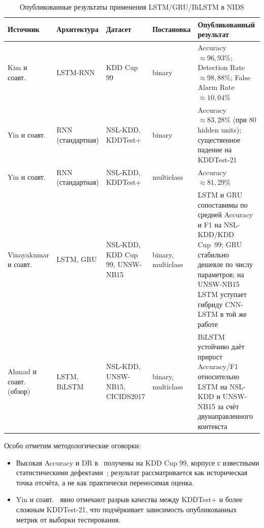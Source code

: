 \begin{table}[H]
\centering
\caption{Опубликованные результаты применения LSTM/GRU/BiLSTM в NIDS}
\label{tab:rnn-results}
\renewcommand{\arraystretch}{1.25}
\setlength{\tabcolsep}{4pt}
\small
\begin{tabularx}{\linewidth}{@{}lXlXX@{}}
\toprule
\textbf{Источник} & \textbf{Архитектура} & \textbf{Датасет} &
\textbf{Постановка} & \textbf{Опубликованный результат} \\
\midrule
Kim и соавт.~\cite{kim2016lstm} &
LSTM-RNN &
KDD Cup 99 &
binary &
Accuracy $\approx 96{,}93\%$; Detection Rate $\approx 98{,}88\%$;
False Alarm Rate $\approx 10{,}04\%$ \\
\addlinespace
Yin и соавт.~\cite{yin2017dlrnn} &
RNN (стандартная) &
NSL-KDD, KDDTest+ &
binary &
Accuracy $\approx 83{,}28\%$ (при 80 hidden units); существенное падение
на KDDTest-21 \\
\addlinespace
Yin и соавт.~\cite{yin2017dlrnn} &
RNN (стандартная) &
NSL-KDD, KDDTest+ &
multiclass &
Accuracy $\approx 81{,}29\%$ \\
\addlinespace
Vinayakumar и соавт.~\cite{vinayakumar2019dl} &
LSTM, GRU &
NSL-KDD, KDD Cup 99, UNSW-NB15 &
binary, multiclass &
LSTM и GRU сопоставимы по средней Accuracy и F1 на NSL-KDD/KDD Cup~99;
GRU стабильно дешевле по числу параметров; на UNSW-NB15 LSTM уступает
гибриду CNN-LSTM в той же работе \\
\addlinespace
Ahmad и соавт.~\cite{ahmad2021nids} (обзор) &
LSTM, BiLSTM &
NSL-KDD, UNSW-NB15, CICIDS2017 &
binary, multiclass &
BiLSTM устойчиво даёт прирост Accuracy/F1 относительно LSTM на NSL-KDD и
UNSW-NB15 за счёт двунаправленного контекста \\
\bottomrule
\end{tabularx}
\end{table}

Особо отметим методологические оговорки:
\begin{itemize}
    \item Высокая Accuracy и DR в~\cite{kim2016lstm} получены на
    KDD Cup 99, корпусе с известными статистическими
    дефектами~\cite{tavallaee2009nslkdd, sommer2010outside}; результат
    рассматривается как историческая точка отсчёта, а не как практически
    переносимая оценка.
    \item Yin и соавт.~\cite{yin2017dlrnn} явно отмечают разрыв качества
    между KDDTest+ и более сложным KDDTest-21, что подчёркивает
    зависимость опубликованных метрик от выборки тестирования.
\end{itemize}

